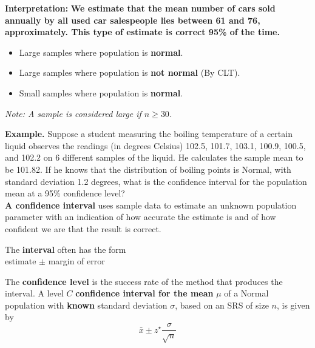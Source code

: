 \vspace{1em}

\noindent\textbf{Interpretation:} \textbf{We estimate that the mean number of cars sold annually by all used car salespeople lies between 61 and 76, approximately. This type of estimate is correct 95\% of the time.}

\vspace{1em}

\begin{tcolorbox}[colback=blue!5!white, colframe=blue!75!black,
  title=\textbf{Cases Where Valid}, fonttitle=\bfseries,
  coltitle=white, colbacktitle=blue!90!black, arc=2mm]

\begin{itemize}
  \item Large samples where population is \textbf{normal}.
  \item Large samples where population is \textbf{not normal} (By CLT).
  \item Small samples where population is \textbf{normal}.
\end{itemize}

\textit{Note: A sample is considered large if $n \geq 30$.}
\end{tcolorbox}

\textbf{Example.} Suppose a student measuring the boiling temperature of a certain liquid observes the readings (in degrees Celsius) 102.5, 101.7, 103.1, 100.9, 100.5, and 102.2 on 6 different samples of the liquid. He calculates the sample mean to be 101.82. If he knows that the distribution of boiling points is Normal, with standard deviation 1.2 degrees, what is the confidence interval for the population mean at a 95\% confidence level?\\
\textbf{A confidence interval} uses sample data to estimate an unknown population parameter with an indication of how accurate the estimate is and of how confident we are that the result is correct.

\vspace{1em}

The \textbf{interval} often has the form\\
\hspace*{2em}estimate $\pm$ margin of error

\vspace{1em}

The \textbf{confidence level} is the success rate of the method that produces the interval.
 A level $C$ \textbf{confidence interval for the mean} $\mu$ of a Normal population with \textbf{known} standard deviation $\sigma$, based on an SRS of size $n$, is given by
\[
\bar{x} \pm z^\star \frac{\sigma}{\sqrt{n}}
\]

